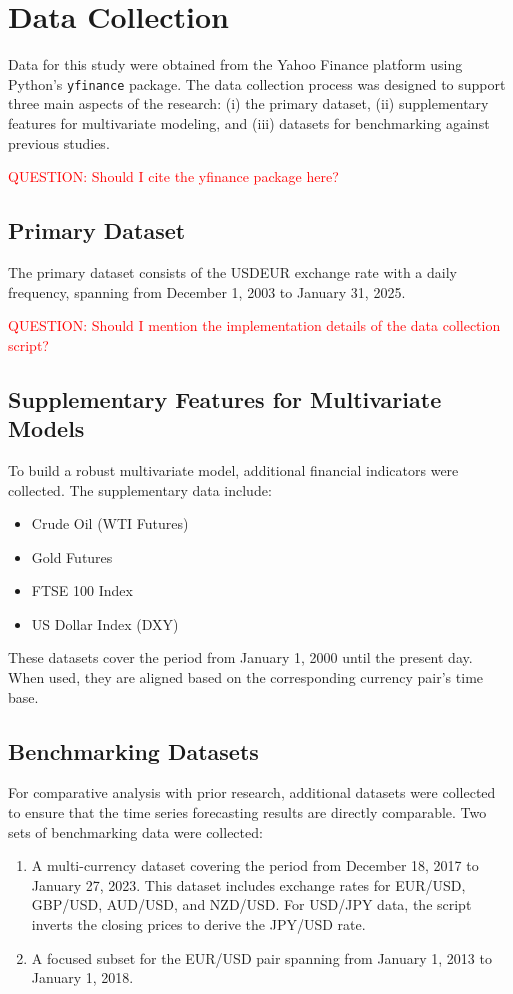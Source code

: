 \section{Data Collection}

Data for this study were obtained from the Yahoo Finance platform using Python’s \texttt{yfinance} package.
The data collection process was designed to support three main aspects of the research: (i) the primary dataset, (ii) supplementary features for multivariate modeling, and (iii) datasets for benchmarking against previous studies.

\textcolor{red}{QUESTION: Should I cite the yfinance package here?}
\subsection{Primary Dataset}
The primary dataset consists of the USDEUR exchange rate with a daily frequency, spanning from December 1, 2003 to January 31, 2025.

\textcolor{red}{QUESTION: Should I mention the implementation details of the data collection script?}


\subsection{Supplementary Features for Multivariate Models}
To build a robust multivariate model, additional financial indicators were collected.
The supplementary data include:
\begin{itemize}
    \item Crude Oil (WTI Futures)
    \item Gold Futures
    \item FTSE 100 Index
    \item US Dollar Index (DXY)
\end{itemize}
These datasets cover the period from January 1, 2000 until the present day.
When used, they are aligned based on the corresponding currency pair's time base.


\subsection{Benchmarking Datasets}
For comparative analysis with prior research, additional datasets were collected to ensure that the time series forecasting results are directly comparable. Two sets of benchmarking data were collected:
\begin{enumerate}
    \item A multi-currency dataset covering the period from December 18, 2017 to January 27, 2023. This dataset includes exchange rates for EUR/USD, GBP/USD, AUD/USD, and NZD/USD. For USD/JPY data, the script inverts the closing prices to derive the JPY/USD rate\cite{Garcia2023ComparisonRegression}.
    \item A focused subset for the EUR/USD pair spanning from January 1, 2013 to January 1, 2018\cite{Yildirim2021ComparisonClassification}.
\end{enumerate}
